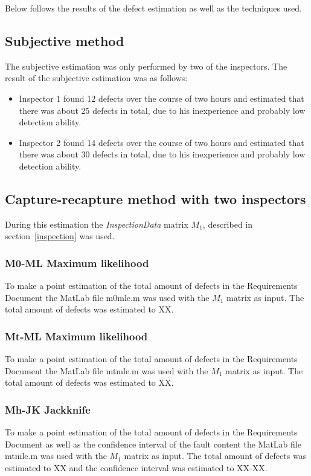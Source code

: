 Below follows the results of the defect estimation as well as the techniques used.

\subsection{Subjective method}
The subjective estimation was only performed by two of the inspectors.
The result of the subjective estimation was as follows:
\begin{itemize}
\item Inspector 1 found 12 defects over the course of two hours and estimated that there was about 25 defects in total, due to his inexperience and probably low detection ability.
\item Inspector 2 found 14 defects over the course of two hours and estimated that there was about 30 defects in total, due to his inexperience and probably low detection ability.
\end{itemize}

\subsection{Capture-recapture method with two inspectors}
During this estimation the \textit{InspectionData} matrix $M_{1}$, described in section~\ref{inspection} was used.
\subsubsection{M0-ML Maximum likelihood}
To make a point estimation of the total amount of defects in the Requirements Document the MatLab file m0mle.m was used with the $M_{1}$ matrix as input. The total amount of defects was estimated to XX.
\subsubsection{Mt-ML Maximum likelihood}
To make a point estimation of the total amount of defects in the Requirements Document the MatLab file mtmle.m was used with the $M_{1}$ matrix as input. The total amount of defects was estimated to XX.
\subsubsection{Mh-JK Jackknife}
To make a point estimation of the total amount of defects in the Requirements Document as well as the confidence interval of the fault content the MatLab file mtmle.m was used with the $M_{1}$ matrix as input. The total amount of defects was estimated to XX and the confidence interval was estimated to XX-XX.

